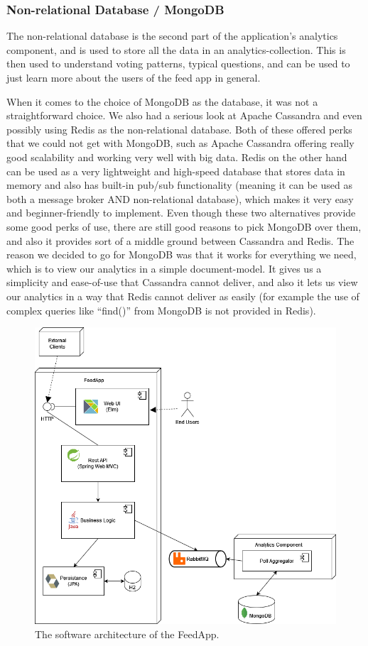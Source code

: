 \subsubsection{Non-relational Database / MongoDB}
The non-relational database is the second part of the application’s analytics component, and is used to store all the data in an analytics-collection. This is then used to understand voting patterns, typical questions, and can be used to just learn more about the users of the feed app in general.

When it comes to the choice of MongoDB as the database, it was not a straightforward choice. We also had a serious look at Apache Cassandra and even possibly using Redis as the non-relational database. Both of these offered perks that we could not get with MongoDB, such as Apache Cassandra offering really good scalability and working very well with big data. Redis on the other hand can be used as a very lightweight and high-speed database that stores data in memory and also has built-in pub/sub functionality (meaning it can be used as both a message broker AND non-relational database), which makes it very easy and beginner-friendly to implement. Even though these two alternatives provide some good perks of use, there are still good reasons to pick MongoDB over them, and also it provides sort of a middle ground between Cassandra and Redis. The reason we decided to go for MongoDB was that it works for everything we need, which is to view our analytics in a simple document-model. It gives us a simplicity and ease-of-use that Cassandra cannot deliver, and also it lets us view our analytics in a way that Redis cannot deliver as easily (for example the use of complex queries like “find()” from MongoDB is not provided in Redis).

\begin{figure}[H]
	\centering
	\includegraphics[scale=0.5]{figs/DAT250architecture.png}
	\caption{The software architecture of the FeedApp.}
	\label{fig:DAT250architecture}
\end{figure}
